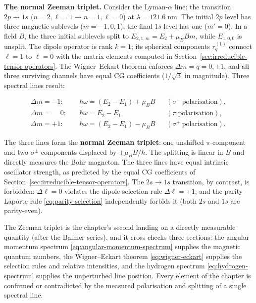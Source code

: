 \textbf{The normal Zeeman triplet.} Consider the Lyman-$\alpha$ line: the transition $2p \to 1s$ ($n=2,\ell=1 \to n=1,\ell=0$) at $\lambda = 121.6\;\text{nm}$. The initial $2p$ level has three magnetic sublevels ($m = -1,0,1$); the final $1s$ level has one ($m'=0$). In a field $B$, the three initial sublevels split to $E_{2,1,m} = E_2 + \mu_B B m$, while $E_{1,0,0}$ is unsplit. The dipole operator is rank $k=1$; its spherical components $r^{(1)}_q$ connect $\ell=1$ to $\ell=0$ with the matrix elements computed in Section~\ref{sec:irreducible-tensor-operators}. The Wigner--Eckart theorem enforces $\Delta m = q = 0,\pm1$, and all three surviving channels have equal CG coefficients ($1/\sqrt{3}$ in magnitude). Three spectral lines result:
\begin{linenomath}
\begin{equation*}
\begin{aligned}
\Delta m = -1:&\quad \hbar\omega = (E_2 - E_1) + \mu_B B &&(\sigma^-\ \text{polarisation}), \\
\Delta m = \phantom{-}0:&\quad \hbar\omega = E_2 - E_1 &&(\pi\ \text{polarisation}), \\
\Delta m = +1:&\quad \hbar\omega = (E_2 - E_1) - \mu_B B &&(\sigma^+\ \text{polarisation}) .
\end{aligned}
\end{equation*}
\end{linenomath}
The three lines form the \textbf{normal Zeeman triplet}: one unshifted $\pi$-component and two $\sigma^\pm$-components displaced by $\pm\mu_B B/\hbar$. The splitting is linear in $B$ and directly measures the Bohr magneton. The three lines have equal intrinsic oscillator strength, as predicted by the equal CG coefficients of Section~\ref{sec:irreducible-tensor-operators}. The $2s \to 1s$ transition, by contrast, is forbidden: $\Delta\ell = 0$ violates the dipole selection rule $\Delta\ell = \pm1$, and the parity Laporte rule \eqref{eq:parity-selection} independently forbids it (both $2s$ and $1s$ are parity-even).

The Zeeman triplet is the chapter's second landing on a directly measurable quantity (after the Balmer series), and it cross-checks three sections: the angular momentum spectrum \eqref{eq:angular-momentum-spectrum} supplies the magnetic quantum numbers, the Wigner--Eckart theorem \eqref{eq:wigner-eckart} supplies the selection rules and relative intensities, and the hydrogen spectrum \eqref{eq:hydrogen-spectrum} supplies the unperturbed line position. Every element of the chapter is confirmed or contradicted by the measured polarisation and splitting of a single spectral line.

